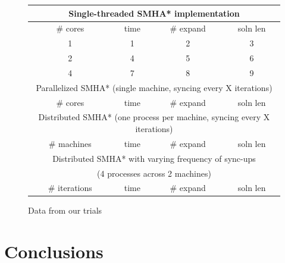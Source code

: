\documentclass[11pt]{article}
\begin{document}
\begin{figure}
\centering
\begin{tabular}{ c | c | c | c }
    \hline
    \multicolumn{4}{c}{Single-threaded SMHA* implementation} \\ \hline    
    \# cores & time & \# expand & soln len \\ \hline
    1 & 1 & 2 & 3 \\ \hline
    2 & 4 & 5 & 6 \\ \hline
    4 & 7 & 8 & 9 \\ \hline
    
     \multicolumn{4}{c}{Parallelized SMHA* (single machine, syncing every X iterations)} \\ \hline
    \# cores & time & \# expand & soln len \\ \hline
    
     \multicolumn{4}{c}{Distributed SMHA* (one process per machine, syncing every X iterations)} \\ \hline
    \# machines & time & \# expand & soln len \\ \hline
    
     \multicolumn{4}{c}{Distributed SMHA* with varying frequency of sync-ups} \\ \hline
     \multicolumn{4}{c}{(4 processes across 2 machines)} \\ \hline
    \# iterations & time & \# expand & soln len \\ \hline

    \hline
\end{tabular}
\caption{Data from our trials}
\label{fig:datatable}
\end{figure}



\section{Conclusions}

\end{document}
